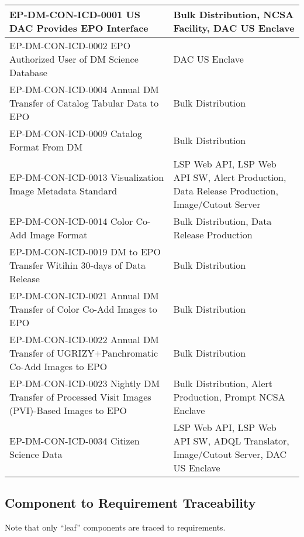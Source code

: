 \begin{longtable}{p{}p{}}
EP-DM-CON-ICD-0001 US DAC Provides EPO Interface & Bulk Distribution, NCSA Facility, DAC US Enclave \\ \hline
EP-DM-CON-ICD-0002 EPO Authorized User of DM Science Database & DAC US Enclave \\ \hline
EP-DM-CON-ICD-0004 Annual DM Transfer of Catalog Tabular Data to EPO & Bulk Distribution \\ \hline
EP-DM-CON-ICD-0009 Catalog Format From DM & Bulk Distribution \\ \hline
EP-DM-CON-ICD-0013 Visualization Image Metadata Standard & LSP Web API, LSP Web API SW, Alert Production, Data Release Production, Image/Cutout Server \\ \hline
EP-DM-CON-ICD-0014 Color Co-Add Image Format & Bulk Distribution, Data Release Production \\ \hline
EP-DM-CON-ICD-0019 DM to EPO Transfer Witihin 30-days of Data Release & Bulk Distribution \\ \hline
EP-DM-CON-ICD-0021 Annual DM Transfer of Color Co-Add Images to EPO & Bulk Distribution \\ \hline
EP-DM-CON-ICD-0022 Annual DM Transfer of UGRIZY+Panchromatic Co-Add Images to EPO & Bulk Distribution \\ \hline
EP-DM-CON-ICD-0023 Nightly DM Transfer of Processed Visit Images (PVI)-Based Images to EPO & Bulk Distribution, Alert Production, Prompt NCSA Enclave \\ \hline
EP-DM-CON-ICD-0034 Citizen Science Data & LSP Web API, LSP Web API SW, ADQL Translator, Image/Cutout Server, DAC US Enclave \\ \hline

\end{longtable}
\normalsize

\subsection{Component to Requirement
Traceability}\label{component-to-requirement-traceability}

Note that only ``leaf'' components are traced to requirements.

\footnotesize

